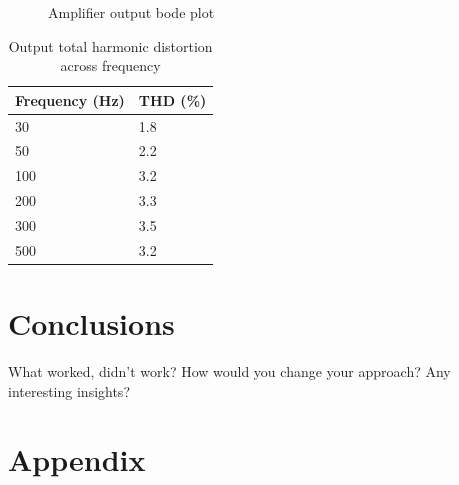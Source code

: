 \documentclass[a4paper,11pt]{article}
\begin{document}
\begin{figure}[h!]
    \centering
    \caption{Amplifier output bode plot}
\end{figure}


\begin{table}[h!]
    \centering
    \begin{tabular}{l|l}
    \rowcolor[HTML]{E0E0E0} 
    \textbf{Frequency (Hz)} & \textbf{THD (\%)} \\ \hline
    30                 & 1.8               \\
    50                 & 2.2               \\
    100                & 3.2               \\
    200                & 3.3               \\
    300                & 3.5               \\
    500                & 3.2              
    \end{tabular}
    \caption{Output total harmonic distortion across frequency}
    \label{T:THD}
\end{table}

\section{Conclusions}

What worked, didn’t work? How would you change your approach? Any interesting insights?



\section*{Appendix}
\end{document}
